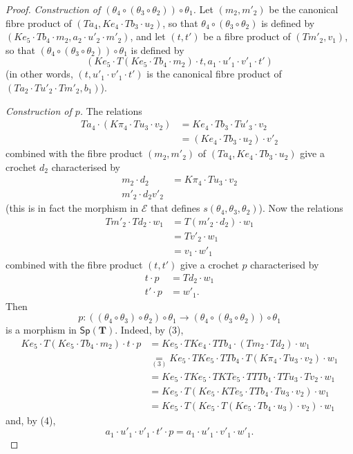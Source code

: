 \documentclass[fleqn]{article}
\newcommand{\oldpage}[1]{\marginpar{\footnotesize$\Big\vert$ \textit{p.~#1}}}
\newcommand{\TT}{\mathbf{T}}
\newcommand{\cat}[1]{\mathcal{#1}}
\newcommand{\Cat}[1]{\mathsf{#1}}
\newcommand{\Sp}[1]{\Cat{Sp}(#1)}
\begin{document}
\begin{proof}
  \medskip

  \emph{Construction of $(\theta_4\circ(\theta_3\circ\theta_2))\circ\theta_1$.}
  Let $(m_2,m'_2)$ be the canonical fibre product of $(Ta_4,Ke_4\cdot Tb_3\cdot u_2)$, so that $\theta_4\circ(\theta_3\circ\theta_2)$ is defined by $(Ke_5\cdot Tb_4\cdot m_2,a_2\cdot u'_2\cdot m'_2)$, and let $(t,t')$ be a fibre product of $(Tm'_2,v_1)$, so that $(\theta_4\circ(\theta_3\circ\theta_2))\circ\theta_1$ is defined by
  \[
    (Ke_5\cdot T(Ke_5\cdot Tb_4\cdot m_2)\cdot t, a_1\cdot u'_1\cdot v'_1\cdot t')
  \]
  (in other words, $(t,u'_1\cdot v'_1\cdot t')$ is the canonical fibre product of $(Ta_2\cdot Tu'_2\cdot Tm'_2,b_1)$).

  \medskip

  \emph{Construction of $p$.}
  The relations
  \[
    \begin{aligned}
      Ta_4\cdot (K\pi_4\cdot Tu_3\cdot v_2)
      &= Ke_4\cdot Tb_3\cdot Tu'_3\cdot v_2
    \\&= (Ke_4\cdot Tb_3\cdot u_2)\cdot v'_2
    \end{aligned}
  \]
  combined with the fibre product $(m_2,m'_2)$ of $(Ta_4,Ke_4\cdot Tb_3\cdot u_2)$ give a crochet $d_2$ characterised by
  \[
    \begin{aligned}
      m_2\cdot d_2
      &= K\pi_4\cdot Tu_3\cdot v_2
    \\m'_2\cdot d_2
      v'_2
    \end{aligned}
    \tag{3}
  \]
  (this is in fact the morphism in $\cat{E}$ that defines $s(\theta_4,\theta_3,\theta_2)$).
  Now the relations
  \[
    \begin{aligned}
      Tm'_2\cdot Td_2\cdot w_1
      &= T(m'_2\cdot d_2)\cdot w_1
    \\&= Tv'_2\cdot w_1
    \\&= v_1\cdot w'_1
    \end{aligned}
  \]
  combined with the fibre product $(t,t')$ give a crochet $p$ characterised by
  \[
    \begin{aligned}
      t\cdot p
      &= Td_2\cdot w_1
    \\t'\cdot p
      &= w'_1.
    \end{aligned}
    \tag{4}
  \]
  \oldpage{254}
  Then
  \[
    p\colon((\theta_4\circ\theta_3)\circ\theta_2)\circ\theta_1
    \to (\theta_4\circ(\theta_3\circ\theta_2))\circ\theta_1
  \]
  is a morphism in $\Sp{\TT}$.
  Indeed, by (3),
  \[
    \begin{aligned}
      Ke_5\cdot T(Ke_5\cdot Tb_4\cdot m_2)\cdot t\cdot p
      &= Ke_5\cdot TKe_4\cdot TTb_4\cdot (Tm_2\cdot Td_2)\cdot w_1
    \\&\underset{(3)}{=} Ke_5\cdot TKe_5\cdot TTb_4\cdot T(K\pi_4\cdot Tu_3\cdot v_2)\cdot w_1
    \\&= Ke_5\cdot TKe_5\cdot TKTe_5\cdot TTTb_4\cdot TTu_3\cdot Tv_2\cdot w_1
    \\&= Ke_5\cdot T(Ke_5\cdot KTe_5\cdot TTb_4\cdot Tu_3\cdot v_2)\cdot w_1
    \\&= Ke_5\cdot T(Ke_5\cdot T(Ke_5\cdot Tb_4\cdot u_3)\cdot v_2)\cdot w_1
    \end{aligned}
  \]
  and, by (4),
  \[
    a_1\cdot u'_1\cdot v'_1\cdot t'\cdot p
    = a_1\cdot u'_1\cdot v'_1\cdot w'_1.
  \]


\end{proof}
\end{document}
